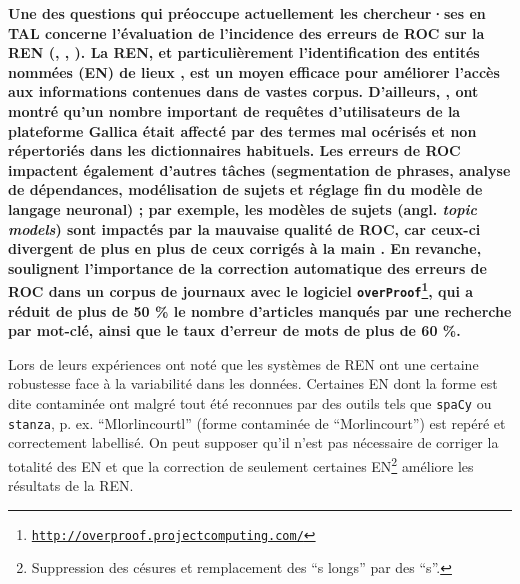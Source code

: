 \textbf{Une des questions qui préoccupe actuellement les chercheur·ses en TAL concerne l’évaluation de l’incidence des erreurs de ROC sur la REN (\cite{chiron:hal-03025508}, \cite{hamdi:hal-03026931}, \cite{DBLP:journals/corr/abs-2302-10204}). %
La REN, et particulièrement l’identification des entités nommées (EN) de lieux \cite{vanStrien-2020}, est un moyen efficace pour améliorer l’accès aux informations contenues dans de vastes corpus.
D'ailleurs, \cite{chiron:hal-03025508}, ont montré qu'un nombre important de requêtes d'utilisateurs de la plateforme Gallica était affecté par des termes mal océrisés et non répertoriés dans les dictionnaires habituels. 
Les erreurs de ROC impactent également d'autres tâches (segmentation de phrases, analyse de dépendances, modélisation de sujets et réglage fin du modèle de langage neuronal) ; par exemple, les \og{}modèles de sujets\fg{} (angl. \textit{topic models}) sont impactés par la mauvaise qualité de ROC, car ceux-ci divergent de plus en plus de ceux corrigés à la main \cite{vanStrien-2020}.
En revanche, \cite{evershed2014correcting} soulignent l'importance de la correction automatique des erreurs de ROC dans un corpus de journaux avec le logiciel \texttt{overProof\footnote{\url{http://overproof.projectcomputing.com/}}}, qui a réduit de plus de 50 \% le nombre d'articles manqués par une recherche par mot-clé, ainsi que le taux d'erreur de mots de plus de 60 \%.}

Lors de leurs expériences \cite{DBLP:conf/gis/Koudoro-Parfait21} %
ont noté que les systèmes de REN ont une certaine robustesse face à la variabilité dans les données. Certaines EN dont la forme est dite \og{}contaminée\fg{} \cite{hamdi:hal-03615997} ont malgré tout été reconnues par des outils tels que \texttt{spaCy} ou \texttt{stanza}, p. ex. “Mlorlincourtl” (forme contaminée de “Morlincourt”)  est repéré et correctement labellisé. On peut supposer qu'il n'est pas nécessaire de corriger la totalité des EN et que la correction de seulement certaines EN\footnote{Suppression des césures et remplacement des ``s longs'' par des ``s''.} \cite{DBLP:conf/konvens/AlexGKT12} améliore les résultats de la REN. 

